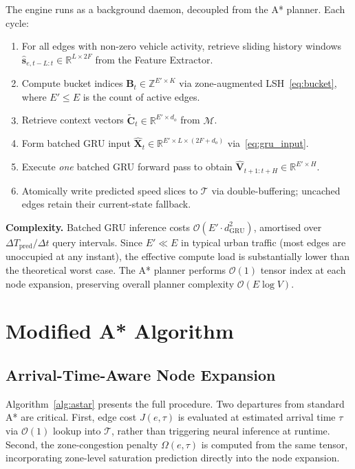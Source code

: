 \documentclass[journal,letterpaper,10pt]{IEEEtran}
\theoremstyle{definition}
\theoremstyle{remark}
\newcommand{\bigO}[1]{\mathcal{O}\!\left(#1\right)}
\newcommand{\R}{\mathbb{R}}
\begin{document}
The engine runs as a background daemon, decoupled from the A*
planner.  Each cycle:
\begin{enumerate}
  \item For all edges with non-zero vehicle activity, retrieve
        sliding history windows
        $\hat{\mathbf{s}}_{e,t-L:t}\in\R^{L\times 2F}$ from the
        Feature Extractor.
  \item Compute bucket indices
        $\mathbf{B}_t\in\mathbb{Z}^{E'\times K}$ via
        zone-augmented LSH~\eqref{eq:bucket}, where $E'\leq E$
        is the count of active edges.
  \item Retrieve context vectors
        $\tilde{\mathbf{C}}_t\in\R^{E'\times d_o}$
        from $\mathcal{M}$.
  \item Form batched GRU input
        $\hat{\mathbf{X}}_t\in\R^{E'\times L\times(2F+d_o)}$
        via~\eqref{eq:gru_input}.
  \item Execute \emph{one} batched GRU forward pass to obtain
        $\hat{\mathbf{V}}_{t+1:t+H}\in\R^{E'\times H}$.
  \item Atomically write predicted speed slices to $\mathcal{T}$
        via double-buffering; uncached edges retain their
        current-state fallback.
\end{enumerate}

\noindent\textbf{Complexity.}\enspace
Batched GRU inference costs $\bigO{E'\cdot d_{\mathrm{GRU}}^2}$,
amortised over $\Delta T_{\mathrm{pred}}/\Delta t$ query intervals.
Since $E'\ll E$ in typical urban traffic (most edges are unoccupied
at any instant), the effective compute load is substantially lower
than the theoretical worst case.  The A* planner performs $\bigO{1}$
tensor index at each node expansion, preserving overall planner
complexity $\bigO{E\log V}$.

\section{Modified A* Algorithm}
\label{sec:astar}

\subsection{Arrival-Time-Aware Node Expansion}

Algorithm~\ref{alg:astar} presents the full procedure.  Two
departures from standard A* are critical.  First, edge cost
$J(e,\tau)$ is evaluated at estimated arrival time $\tau$ via
$\bigO{1}$ lookup into $\mathcal{T}$, rather than triggering neural
inference at runtime.  Second, the zone-congestion penalty
$\Omega(e,\tau)$ is computed from the same tensor, incorporating
zone-level saturation prediction directly into the node expansion.
\end{document}

